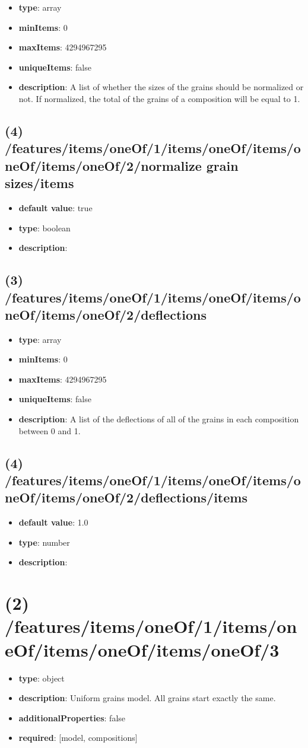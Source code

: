 \begin{itemize}[leftmargin=3em]\item {\bf type}: array
\item {\bf minItems}: 0
\item {\bf maxItems}: 4294967295
\item {\bf uniqueItems}: false
\item {\bf description}: A list of whether the sizes of the grains should be normalized or not. If normalized, the total of the grains of a composition will be equal to 1.
\end{itemize}\subsection{(4) /features/items/oneOf/1/items/oneOf/items/oneOf/items/oneOf/2/normalize grain sizes/items}
\begin{itemize}[leftmargin=4em]\item {\bf default value}: true
\item {\bf type}: boolean
\item {\bf description}: 
\end{itemize}\subsection{(3) /features/items/oneOf/1/items/oneOf/items/oneOf/items/oneOf/2/deflections}
\begin{itemize}[leftmargin=3em]\item {\bf type}: array
\item {\bf minItems}: 0
\item {\bf maxItems}: 4294967295
\item {\bf uniqueItems}: false
\item {\bf description}: A list of the deflections of all of the grains in each composition between 0 and 1.
\end{itemize}\subsection{(4) /features/items/oneOf/1/items/oneOf/items/oneOf/items/oneOf/2/deflections/items}
\begin{itemize}[leftmargin=4em]\item {\bf default value}: 1.0
\item {\bf type}: number
\item {\bf description}: 
\end{itemize}\section{(2) /features/items/oneOf/1/items/oneOf/items/oneOf/items/oneOf/3}
\begin{itemize}[leftmargin=2em]\item {\bf type}: object
\item {\bf description}: Uniform grains model. All grains start exactly the same.
\item {\bf additionalProperties}: false
\item {\bf required}: [model, compositions]\end{itemize}
